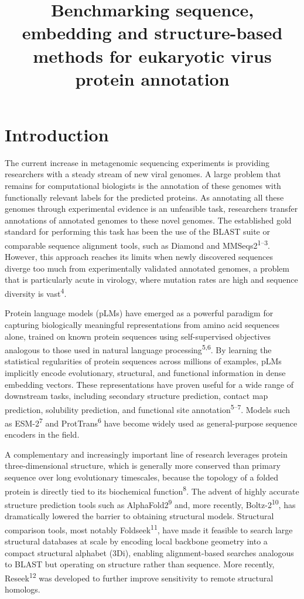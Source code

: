 \documentclass[
  sn-nature,
]{sn-jnl}
\title[Benchmarking sequence, embedding and structure-based methods for
eukaryotic virus protein annotation]{Benchmarking sequence, embedding
and structure-based methods for eukaryotic virus protein annotation}
\author*[1]{\fnm{Lander} \sur{De
Coninck}\orcidlink{0000-0001-6847-2379}}\email{lander.deconinck@kuleuven.be}\author[2]{\fnm{Uri} \sur{Neri}\orcidlink{0000-0003-0894-2484}}\email{uneri@lbl.gov}\author[2]{\fnm{Susie} \sur{Grigson}\orcidlink{0000-0003-4738-3451}}\email{sgrigson@lbl.gov}\author[3]{\fnm{Dimitris} \sur{Karapliafis}\orcidlink{0009-0004-3960-6461}}\email{dimitris.karapliafis@wur.nl}\author[2]{\fnm{Simon} \sur{Roux}\orcidlink{0000-0002-5831-5895}}\email{sroux@lbl.gov}
\affil[1]{\orgname{KU Leuven}%
, \orgdiv{Microbiology, Immunology and Transplantation}%
, \orggroup{Clinical and Epidemiological Virology}%
, \orgaddress{%
  \street{Herestraat 49, box 1040}%
  , \city{Leuven}%
  , \postcode{3000}%
  , \country{Belgium}%
}}
\affil[2]{\orgname{Lawrence Berkeley National Laboratory}%
, \orgdiv{DOE Joint Genome Institute}%
%
, \orgaddress{%
  \street{Cyclotron Road 1}%
  , \city{Berkeley}%
  , \postcode{CA 94720}%
  , \country{USA}%
}}
\affil[3]{\orgname{Wageningen University}%
%
, \orggroup{Bioinformatics Group}%
, \orgaddress{%
  \street{Droevendaalsesteeg 1}%
  , \city{Wageningen}%
  , \postcode{6708PB}%
  , \country{The Netherlands}%
}}
\begin{document}
\maketitle


\section{Introduction}\label{introduction}

The current increase in metagenomic sequencing experiments is providing
researchers with a steady stream of new viral genomes. A large problem
that remains for computational biologists is the annotation of these
genomes with functionally relevant labels for the predicted proteins. As
annotating all these genomes through experimental evidence is an
unfeasible task, researchers transfer annotations of annotated genomes
to these novel genomes. The established gold standard for performing
this task has been the use of the BLAST suite or comparable sequence
alignment tools, such as Diamond and MMSeqs2\textsuperscript{1--3}.
However, this approach reaches its limits when newly discovered
sequences diverge too much from experimentally validated annotated
genomes, a problem that is particularly acute in virology, where
mutation rates are high and sequence diversity is
vast\textsuperscript{4}.

Protein language models (pLMs) have emerged as a powerful paradigm for
capturing biologically meaningful representations from amino acid
sequences alone, trained on known protein sequences using
self-supervised objectives analogous to those used in natural language
processing\textsuperscript{5,6}. By learning the statistical
regularities of protein sequences across millions of examples, pLMs
implicitly encode evolutionary, structural, and functional information
in dense embedding vectors. These representations have proven useful for
a wide range of downstream tasks, including secondary structure
prediction, contact map prediction, solubility prediction, and
functional site annotation\textsuperscript{5--7}. Models such as
ESM-2\textsuperscript{7} and ProtTrans\textsuperscript{6} have become
widely used as general-purpose sequence encoders in the field.

A complementary and increasingly important line of research leverages
protein three-dimensional structure, which is generally more conserved
than primary sequence over long evolutionary timescales, because the
topology of a folded protein is directly tied to its biochemical
function\textsuperscript{8}. The advent of highly accurate structure
prediction tools such as AlphaFold2\textsuperscript{9} and, more
recently, Boltz-2\textsuperscript{10}, has dramatically lowered the
barrier to obtaining structural models. Structural comparison tools,
most notably Foldseek\textsuperscript{11}, have made it feasible to
search large structural databases at scale by encoding local backbone
geometry into a compact structural alphabet (3Di), enabling
alignment-based searches analogous to BLAST but operating on structure
rather than sequence. More recently, Reseek\textsuperscript{12} was
developed to further improve sensitivity to remote structural homologs.
\end{document}
